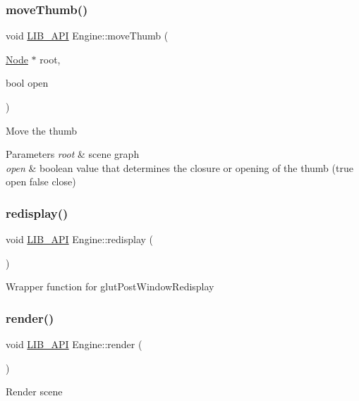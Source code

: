 \subsubsection{\texorpdfstring{move\+Thumb()}{moveThumb()}}
{\footnotesize\ttfamily void \hyperlink{Engine_8h_a77278c8cc96e39fb27b5d0a347c8fb3d}{L\+I\+B\+\_\+\+A\+PI} Engine\+::move\+Thumb (\begin{DoxyParamCaption}\item[{\hyperlink{classNode}{Node} $\ast$}]{root,  }\item[{bool}]{open }\end{DoxyParamCaption})}

Move the thumb 
\begin{DoxyParams}{Parameters}
{\em root} & scene graph \\
\hline
{\em open} & boolean value that determines the closure or opening of the thumb (true open false close) \\
\hline
\end{DoxyParams}
\mbox{\label{classEngine_ac12f3f0be76b8394772aeac4053ad2f2}} 
\subsubsection{\texorpdfstring{redisplay()}{redisplay()}}
{\footnotesize\ttfamily void \hyperlink{Engine_8h_a77278c8cc96e39fb27b5d0a347c8fb3d}{L\+I\+B\+\_\+\+A\+PI} Engine\+::redisplay (\begin{DoxyParamCaption}{ }\end{DoxyParamCaption})}

Wrapper function for glut\+Post\+Window\+Redisplay \mbox{\label{classEngine_ab48f7c79b39ed583b0568c381d444944}} 
\subsubsection{\texorpdfstring{render()}{render()}}
{\footnotesize\ttfamily void \hyperlink{Engine_8h_a77278c8cc96e39fb27b5d0a347c8fb3d}{L\+I\+B\+\_\+\+A\+PI} Engine\+::render (\begin{DoxyParamCaption}{ }\end{DoxyParamCaption})}

Render scene \mbox{\label{classEngine_a5b6cc6eb1b71934aadc4402c67f983ed}} 
